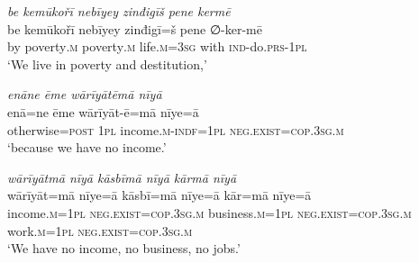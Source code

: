 \ea \label{ŽM.58}
\textit{be kemūkořī nebīyey zinđigīš pene kermē} \\ 
\gll be kemūkořī nebīyey zinđigī=š pene ∅-ker-mē \\ 
 by poverty\textsc{.m} poverty\textsc{.m} life\textsc{.m}\textsc{=3sg} with \textsc{ind-}do\textsc{.prs}\textsc{-\textsc{1pl}} \\ 
\glt `We live in poverty and destitution,'
\z 
 
\ea \label{ŽM.59}
\textit{enāne ēme wārīyātēmā nīyā} \\ 
\gll enā=ne ēme wārīyāt-ē=mā nīye=ā \\ 
 otherwise\textsc{=\textsc{post}} \textsc{1pl} income\textsc{.m}\textsc{-indf}\textsc{=\textsc{1pl}} \textsc{\textsc{neg.}exist}\textsc{=cop}\textsc{.3sg}\textsc{.m} \\ 
\glt `because we have no income.'
\z 
 
\ea \label{ŽM.60}
\textit{wārīyātmā nīyā kāsbīmā nīyā kārmā nīyā} \\ 
\gll wārīyāt=mā nīye=ā kāsbī=mā nīye=ā kār=mā nīye=ā \\ 
 income\textsc{.m}\textsc{=\textsc{1pl}} \textsc{\textsc{neg.}exist}\textsc{=cop}\textsc{.3sg}\textsc{.m} business\textsc{.m}\textsc{=\textsc{1pl}} \textsc{\textsc{neg.}exist}\textsc{=cop}\textsc{.3sg}\textsc{.m} work\textsc{.m}\textsc{=\textsc{1pl}} \textsc{\textsc{neg.}exist}\textsc{=cop}\textsc{.3sg}\textsc{.m} \\ 
\glt `We have no income, no business, no jobs.'
\z 
 
